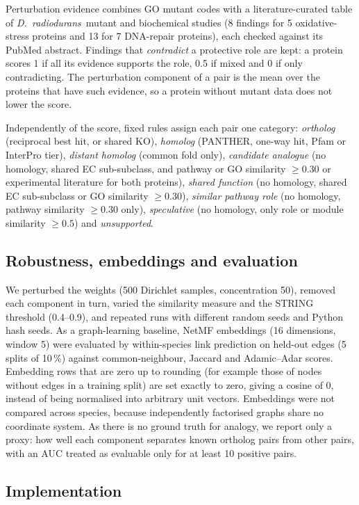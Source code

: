 \documentclass[conference]{IEEEtran}
\newcommand{\Dr}{\emph{D.~radiodurans}}
\begin{document}
Perturbation evidence combines GO mutant codes with a literature-curated table of \Dr\ mutant and
biochemical studies (8 findings for 5 oxidative-stress proteins and 13 for 7 DNA-repair proteins),
each checked against its PubMed abstract. Findings that \emph{contradict} a protective role are
kept: a protein scores 1 if all its evidence supports the role, 0.5 if mixed and 0 if only
contradicting. The perturbation component of a pair is the mean over the proteins that have such
evidence, so a protein without mutant data does not lower the score.

Independently of the score, fixed rules assign each pair one category: \emph{ortholog} (reciprocal
best hit, or shared KO), \emph{homolog} (PANTHER, one-way hit, Pfam or InterPro tier),
\emph{distant homolog} (common fold only), \emph{candidate analogue} (no homology, shared EC
sub-subclass, and pathway or GO similarity $\geq 0.30$ or experimental literature for both
proteins), \emph{shared function} (no homology, shared EC sub-subclass or GO similarity
$\geq 0.30$), \emph{similar pathway role} (no homology, pathway similarity $\geq 0.30$ only),
\emph{speculative} (no homology, only role or module similarity $\geq 0.5$) and
\emph{unsupported}.

\subsection{Robustness, embeddings and evaluation}

We perturbed the weights (500 Dirichlet samples, concentration 50), removed each component in
turn, varied the similarity measure and the STRING threshold (0.4--0.9), and repeated runs with
different random seeds and Python hash seeds. As a graph-learning baseline, NetMF embeddings
\cite{netmf} (16 dimensions, window 5) were evaluated by within-species link prediction on held-out
edges (5 splits of 10\,\%) against common-neighbour, Jaccard and Adamic--Adar \cite{adamic2003}
scores. Embedding rows that are zero up to rounding (for example those of nodes without edges in
a training split) are set exactly to zero, giving a cosine of 0, instead of being normalised into
arbitrary unit vectors. Embeddings were not compared across species, because independently
factorised graphs share no coordinate system. As there is no ground truth for analogy, we report
only a proxy: how well
each component separates known ortholog pairs from other pairs, with an AUC treated as evaluable
only for at least 10 positive pairs.

\subsection{Implementation}
\end{document}
